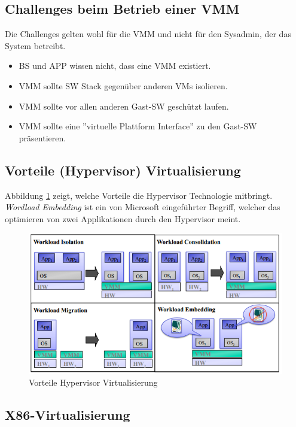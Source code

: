 \subsection{Challenges beim Betrieb einer VMM}
Die Challenges gelten wohl für die VMM und nicht für den Sysadmin, der das System betreibt.
\begin{itemize}
	\item BS und APP wissen nicht, dass eine VMM existiert.
	\item VMM sollte SW Stack gegenüber anderen VMs isolieren.
	\item VMM sollte vor allen anderen Gast-SW geschützt laufen.
	\item VMM sollte eine ''virtuelle Plattform Interface'' zu den Gast-SW präsentieren.
\end{itemize}

\newpage

\subsection{Vorteile (Hypervisor) Virtualisierung}
Abbildung \ref{fig:vorteile-hypervisor-virtualisierung} zeigt, welche Vorteile die Hypervisor Technologie mitbringt. \emph{Wordload Embedding} ist ein von Microsoft eingeführter Begriff, welcher das optimieren von zwei Applikationen durch den Hypervisor meint.
\begin{figure}[h!]
	\centering
	\includegraphics[width=0.7\linewidth]{fig/vorteile-hypervisor-virtualisierung}
	\caption{Vorteile Hypervisor Virtualisierung}
	\label{fig:vorteile-hypervisor-virtualisierung}
\end{figure}

\subsection{X86-Virtualisierung}
